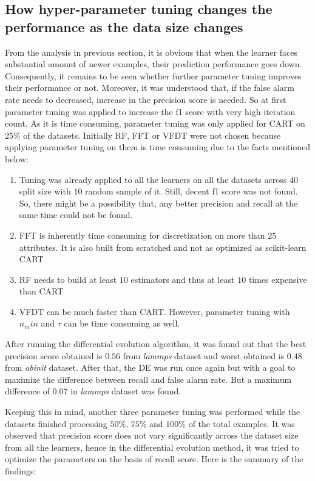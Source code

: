 \documentclass[sigplan]{acmart}\settopmatter{printfolios=true,printccs=false,printacmref=false}
\begin{document}
\subsection{How hyper-parameter tuning changes the performance as the data size changes}
From the analysis in previous section, it is obvious that when the learner faces substantial amount of newer examples, their prediction performance goes down. Consequently, it remains to be seen whether further parameter tuning improves their performance or not. Moreover, it was understood that, if the false alarm rate needs to decreased, increase in the precision score is needed. So at first parameter tuning was applied to increase the f1 score with very high iteration count. As it is time consuming, parameter tuning was only applied for CART on $25\%$ of the datasets. Initially RF, FFT or VFDT were not chosen because applying parameter tuning on them is time consuming due to the facts mentioned below:

\begin{enumerate}
	\item Tuning was already applied to all the learners on all the datasets across $40$ split size with $10$ random sample of it. Still, decent f1 score was not found. So, there might be a possibility that, any better precision and recall at the same time could not be found. 
	\item FFT is inherently time consuming for discretization on more than $25$ attributes. It is also built from scratched and not as optimized as scikit-learn CART
	\item RF needs to build at least $10$ estimators and thus at least $10$ times expensive than CART
	\item VFDT can be much faster than CART. However, parameter tuning with $n_min$ and $\tau$ can be time consuming as well.
\end{enumerate} 

After running the differential evolution algorithm, it was found out that the best precision score obtained is $0.56$ from \textit{lammps} dataset and worst obtained is $0.48$ from \textit{abinit} dataset. After that, the DE was run once again but with a goal to maximize the difference between recall and false alarm rate. But a maximum difference of $0.07$ in \textit{lammps} dataset was found.

Keeping this in mind, another three parameter tuning was performed while the datasets finished processing $50\%$, $75\%$ and $100\%$ of the total examples. It was observed that precision score does not vary significantly across the dataset size from all the learners, hence in the differential evolution method, it was tried to optimize the parameters on the basis of recall score. Here is the summary of the findings:
\end{document}
